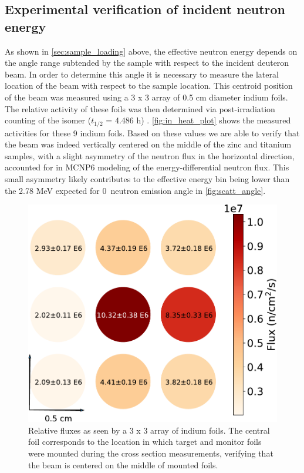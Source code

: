 \documentclass[5p]{elsarticle}
\begin{document}
\subsection{Experimental verification of incident neutron energy}\label{sec:lee_sec}

As shown in \autoref{sec:sample_loading} above, the effective neutron energy depends on the angle range subtended by the sample with respect to the incident deuteron beam.
 In order to determine this angle it is necessary to measure the lateral location of the beam with respect to the sample location.
 This centroid position of the beam was measured using a 3 x 3 array of 0.5 cm diameter indium foils.
 The relative activity of these foils was then determined via post-irradiation counting of the  isomer ($t_{1/2}$ = 4.486 h) \cite{Blachot2012}.
 \autoref{fig:in_heat_plot}  shows the measured activities for these 9 indium foils.
 Based on these values we are able to verify that the beam was indeed vertically centered on the middle of the zinc and titanium samples,  with a slight asymmetry of the neutron flux in the horizontal direction, accounted for in MCNP6 modeling of the energy-differential neutron flux. This small asymmetry likely contributes to the effective energy bin being lower than the 2.78 MeV expected for 0\degree\ neutron emission angle in \autoref{fig:scatt_angle}.
  


\begin{figure}
 \centering
 \includegraphics[scale=0.55]{./figures/fig1_cropped.pdf}
 \caption{Relative fluxes as seen by a 3 x 3 array of indium foils. The central foil corresponds to the location in which target and monitor foils were mounted during the cross section measurements, verifying that the beam is centered on the middle of mounted foils.}
 \label{fig:in_heat_plot}
\end{figure}
\end{document}
